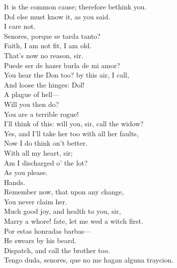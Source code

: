 \documentclass[a4paper,oneside]{memoir}
\begin{document}
\begin{drama*}
\facespeaks It is the common cause; therefore bethink you.\\
Dol else must know it, as you said.\\
\subtlespeaks {} I care not.\\
\surlyspeaks Senores, porque se tarda tanto?\\
\subtlespeaks Faith, I am not fit, I am old.\\
\facespeaks {} That's now no reason, sir.\\
\surlyspeaks Puede ser de hazer burla de mi amor?\\
\facespeaks You hear the Don too? by this air, I call,\\
And loose the hinges: Dol!\\
\subtlespeaks {} A plague of hell---\\
\facespeaks Will you then do?\\
\subtlespeaks {} You are a terrible rogue!\\
I'll think of this: will you, sir, call the widow?\\
\facespeaks Yes, and I'll take her too with all her faults,\\
Now I do think on't better.\\
\subtlespeaks {} With all my heart, sir;\\
Am I discharged o' the lot?\\
\facespeaks {} As you please.\\
\subtlespeaks Hands.\\
\facespeaks {} Remember now, that upon any change,\\
You never claim her.\\
\subtlespeaks {} Much good joy, and health to you, sir,\\
Marry a whore! fate, let me wed a witch first.\\
\surlyspeaks Por estas honradas barbas---\\
\subtlespeaks {} He swears by his beard.\\
Dispatch, and call the brother too.\\
\surlyspeaks {} Tengo duda, senores, que no me hagan alguna traycion.\\

\end{drama*}
\end{document}
